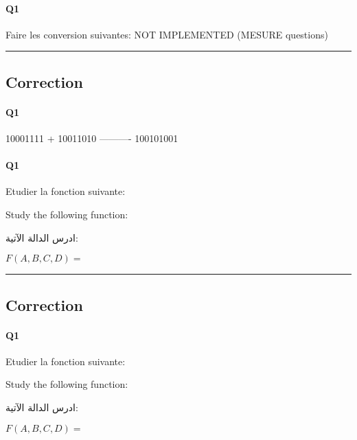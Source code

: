 \paragraph{Q1}

Faire les conversion suivantes: NOT IMPLEMENTED (MESURE questions) 


\hrule width 1\linewidth
\pagebreak

\subsection{Correction}


\paragraph{Q1}

  10001111
+ 10011010
----------
 100101001

\pagebreak

\paragraph{Q1}



Etudier la fonction suivante:



Study the following function:

\begin{arab}[utf]
ادرس الدالة الآتية:
\end{arab}
$F(A,B,C,D) =$



 




\hrule width 1\linewidth
\pagebreak

\subsection{Correction}


\paragraph{Q1}



Etudier la fonction suivante:



Study the following function:

\begin{arab}[utf]
ادرس الدالة الآتية:
\end{arab}
$F(A,B,C,D) =$





